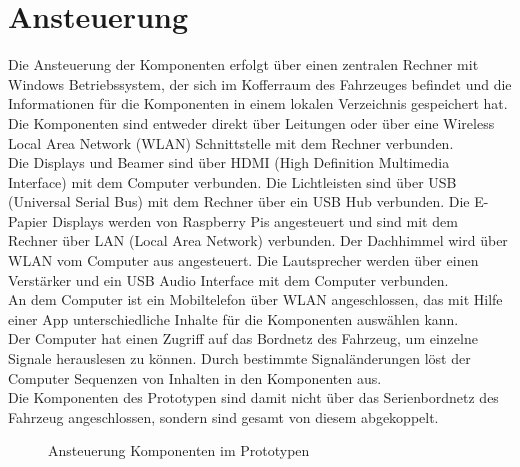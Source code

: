 \section{Ansteuerung}
Die Ansteuerung der Komponenten erfolgt über einen zentralen Rechner mit Windows Betriebssystem, der sich im Kofferraum des Fahrzeuges befindet und die Informationen für die Komponenten in einem lokalen Verzeichnis gespeichert hat. Die Komponenten sind entweder direkt über Leitungen oder über eine Wireless Local Area Network (WLAN) Schnittstelle mit dem Rechner verbunden.\\
Die Displays und Beamer sind über HDMI (High Definition Multimedia Interface) mit dem Computer verbunden. Die Lichtleisten sind über USB (Universal Serial Bus) mit dem Rechner über ein USB Hub verbunden. Die E-Papier Displays werden von Raspberry Pis angesteuert und sind mit dem Rechner über LAN (Local Area Network) verbunden. Der Dachhimmel wird über WLAN vom Computer aus angesteuert. Die Lautsprecher werden über einen Verstärker und ein USB Audio Interface mit dem Computer verbunden.\\
An dem Computer ist ein Mobiltelefon über WLAN angeschlossen, das mit Hilfe einer App unterschiedliche Inhalte für die Komponenten auswählen kann.\\
Der Computer hat einen Zugriff auf das Bordnetz des Fahrzeug, um einzelne Signale herauslesen zu können. Durch bestimmte Signaländerungen löst der Computer Sequenzen von Inhalten in den Komponenten aus.\\
Die Komponenten des Prototypen sind damit nicht über das Serienbordnetz des Fahrzeug angeschlossen, sondern sind gesamt von diesem abgekoppelt.

\begin{figure}[hbt]
	\centering
	
	\caption[Ansteuerung Komponenten im Prototypen]{Ansteuerung Komponenten im Prototypen}
	\label{fig:tikz_ansteuerung}
\end{figure}